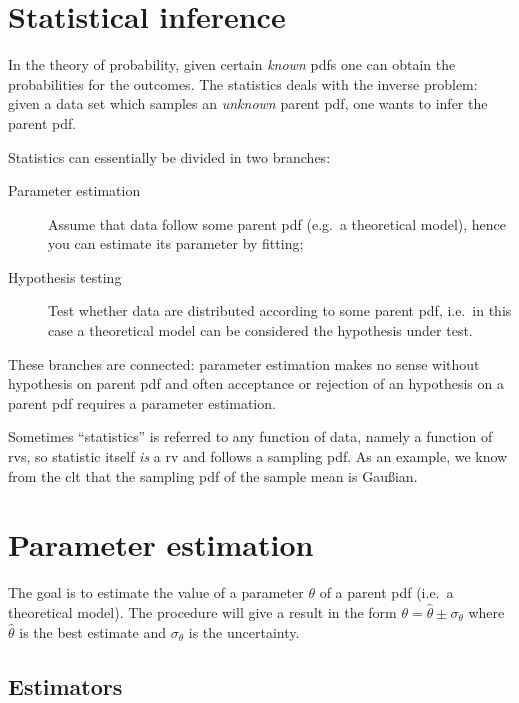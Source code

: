 \section{Statistical inference}

In the theory of probability, given certain \emph{known} \acp{pdf} one can obtain the probabilities for the outcomes.
The statistics deals with the inverse problem: given a data set which samples an \emph{unknown} parent \ac{pdf}, one wants to infer the parent \ac{pdf}.


Statistics can essentially be divided in two branches:
\begin{description}
	\item[Parameter estimation]
		Assume that data follow some parent \ac{pdf} (e.g.~a theoretical model), hence you can estimate its parameter by fitting;

	\item[Hypothesis testing]
		Test whether data are distributed according to some parent \ac{pdf}, i.e.~in this case a theoretical model can be considered the hypothesis under test.
\end{description}
These branches are connected:
parameter estimation makes no sense without hypothesis on parent \ac{pdf} and often acceptance or rejection of an hypothesis on a parent \ac{pdf} requires a parameter estimation.


Sometimes ``statistics'' is referred to any function of data, namely a function of \acp{rv}, so statistic itself \emph{is} a \ac{rv} and follows a sampling \ac{pdf}.
As an example, we know from the \ac{clt} that the sampling \ac{pdf} of the sample mean is Gau\ss{}ian.

\section{Parameter estimation}

The goal is to estimate the value of a parameter $\theta$ of a parent \ac{pdf} (i.e.~a theoretical model).
The procedure will give a result in the form $\theta = \hat\theta \pm \sigma_\theta$ where $\hat\theta$ is the best estimate and $\sigma_\theta$ is the uncertainty.


\subsection{Estimators}

